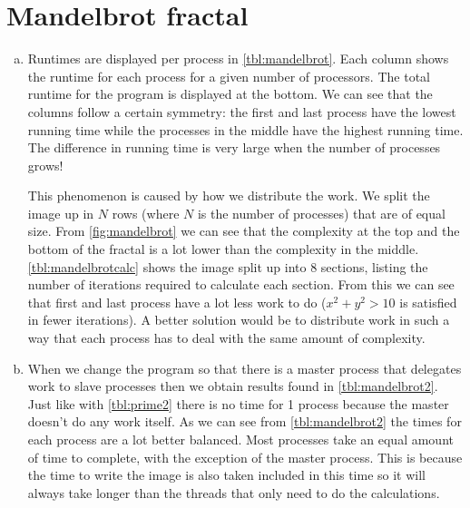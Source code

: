 \documentclass[a4paper]{article}
\begin{document}
\section{Mandelbrot fractal}
\begin{enumerate}[(a)]
	\item Runtimes are displayed per process in \autoref{tbl:mandelbrot}. Each column shows the runtime for each process for a given number of processors. The total runtime for the program is displayed at the bottom. We can see that the columns follow a certain symmetry: the first and last process have the lowest running time while the processes in the middle have the highest running time. The difference in running time is very large when the number of processes grows!
	
	This phenomenon is caused by how we distribute the work. We split the image up in $N$ rows (where $N$ is the number of processes) that are of equal size. From \autoref{fig:mandelbrot} we can see that the complexity at the top and the bottom of the fractal is a lot lower than the complexity in the middle. \autoref{tbl:mandelbrotcalc} shows the image split up into 8 sections, listing the number of iterations required to calculate each section. From this we can see that first and last process have a lot less work to do ($x^2 + y^2 > 10$ is satisfied in fewer iterations). A better solution would be to distribute work in such a way that each process has to deal with the same amount of complexity.
	
	\item When we change the program so that there is a master process that delegates work to slave processes then we obtain results found in \autoref{tbl:mandelbrot2}. Just like with \autoref*{tbl:prime2} there is no time for 1 process because the master doesn't do any work itself. As we can see from \autoref{tbl:mandelbrot2} the times for each process are a lot better balanced. Most processes take an equal amount of time to complete, with the exception of the master process. This is because the time to write the image is also taken included in this time so it will always take longer than the threads that only need to do the calculations.
\end{enumerate}
\end{document}
